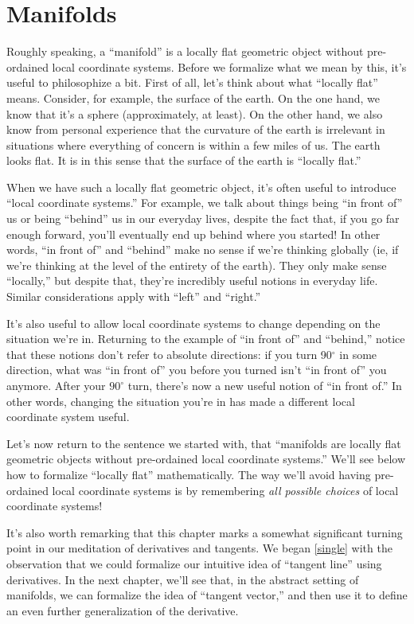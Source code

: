 \chapter{Manifolds}

Roughly speaking, a ``manifold'' is a locally flat geometric object without pre-ordained local coordinate systems. Before we formalize what we mean by this, it's useful to philosophize a bit. First of all, let's think about what ``locally flat'' means. Consider, for example, the surface of the earth. On the one hand, we know that it's a sphere (approximately, at least). On the other hand, we also know from personal experience that the curvature of the earth is irrelevant in situations where everything of concern is within a few miles of us. The earth looks flat. It is in this sense that the surface of the earth is ``locally flat.'' 

When we have such a locally flat geometric object, it's often useful to introduce ``local coordinate systems.'' For example, we talk about things being ``in front of'' us or being ``behind'' us in our everyday lives, despite the fact that, if you go far enough forward, you'll eventually end up behind where you started! In other words, ``in front of'' and ``behind'' make no sense if we're thinking globally (ie, if we're thinking at the level of the entirety of the earth). They only make sense ``locally,'' but despite that, they're incredibly useful notions in everyday life. Similar considerations apply with ``left'' and ``right.''

It's also useful to allow local coordinate systems to change depending on the situation we're in. Returning to the example of ``in front of'' and ``behind,'' notice that these notions don't refer to absolute directions: if you turn 90$^\circ$ in some direction, what was ``in front of'' you before you turned isn't ``in front of'' you anymore. After your $90^\circ$ turn, there's now a new useful notion of ``in front of.'' In other words, changing the situation you're in has made a different local coordinate system useful.

Let's now return to the sentence we started with, that ``manifolds are locally flat geometric objects without pre-ordained local coordinate systems.'' We'll see below how to formalize ``locally flat'' mathematically. The way we'll avoid having pre-ordained local coordinate systems is by remembering \emph{all possible choices} of local coordinate systems! 

It's also worth remarking that this chapter marks a somewhat significant turning point in our meditation of derivatives and tangents. We began \cref{single} with the observation that we could formalize our intuitive idea of ``tangent line'' using  derivatives. In the next chapter, we'll see that, in the abstract setting of manifolds, we can formalize the idea of ``tangent vector,'' and then use it to define an even further generalization of the derivative. 

